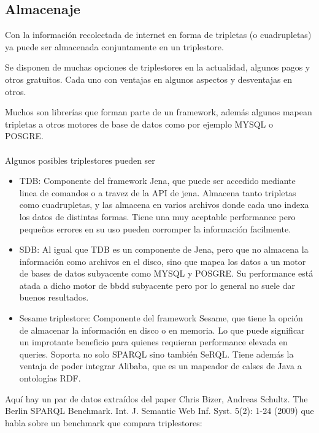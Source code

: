 \subsection{Almacenaje}

Con la información recolectada de internet en forma de tripletas (o cuadrupletas) ya puede ser almacenada conjuntamente en un triplestore. 

Se disponen de muchas opciones de triplestores en la actualidad, algunos pagos y otros gratuitos. Cada uno con ventajas en algunos aspectos y desventajas en otros.

Muchos son librerías que forman parte de un framework, además algunos mapean tripletas a otros motores de base de datos como por ejemplo MYSQL o POSGRE.
\\\\
Algunos posibles triplestores pueden ser
\begin{itemize}
\item TDB: Componente del framework Jena, que puede ser accedido mediante linea de comandos o a travez de la API de jena. Almacena tanto tripletas como cuadrupletas, y las almacena en varios archivos donde cada uno indexa los datos de distintas formas. Tiene una muy aceptable performance pero pequeños errores en su uso pueden corromper la información facilmente.

\item SDB: Al igual que TDB es un componente de Jena, pero que no almacena la información como archivos en el disco, sino que mapea los datos a un motor de bases de datos subyacente como MYSQL y POSGRE. Su performance está atada a dicho motor de bbdd subyacente pero por lo general no suele dar buenos resultados. 

\item Sesame triplestore: Componente del framework Sesame, que tiene la opción de almacenar la información en disco o en memoria. Lo que puede significar un improtante beneficio para quienes requieran performance elevada en queries. Soporta no solo SPARQL sino también SeRQL. Tiene además la ventaja de poder integrar Alibaba, que es un mapeador de calses de Java a ontologías RDF.
\end{itemize}

\noindent Aquí hay un par de datos extraídos del paper Chris Bizer, Andreas Schultz. The Berlin SPARQL Benchmark. Int. J. Semantic Web Inf. Syst. 5(2): 1-24 (2009) que habla sobre un benchmark que compara triplestores:

